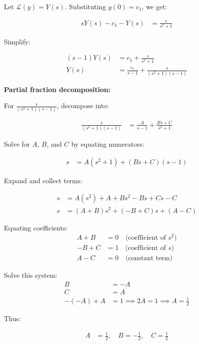 \documentclass[journal]{IEEEtran}
\begin{document}
	Let $\mathcal{L}(y) = Y(s)$. Substituting $y(0) = c_1$, we get:
	
	\begin{align}
		sY(s) - c_1 - Y(s) &= \frac{s}{s^2 + 1}
	\end{align}
	
	Simplify:
	
	\begin{align}
		(s - 1)Y(s) &= c_1 + \frac{s}{s^2 + 1} \\
		Y(s) &= \frac{c_1}{s - 1} + \frac{s}{(s^2 + 1)(s - 1)}
	\end{align}
	
	\textbf{Partial fraction decomposition:}
	
	For $\frac{s}{(s^2 + 1)(s - 1)}$, decompose into:
	
	\begin{align}
		\frac{s}{(s^2 + 1)(s - 1)} &= \frac{A}{s - 1} + \frac{Bs + C}{s^2 + 1}
	\end{align}
	
	Solve for $A$, $B$, and $C$ by equating numerators:
	
	\begin{align}
		s &= A(s^2 + 1) + (Bs + C)(s - 1)
	\end{align}
	
	Expand and collect terms:
	
	\begin{align}
		s &= A(s^2) + A + Bs^2 - Bs + Cs - C \\
		s &= (A + B)s^2 + (-B + C)s + (A - C)
	\end{align}
	
	Equating coefficients:
	\begin{align}
		A + B &= 0 \quad \text{(coefficient of $s^2$)} \\
		-B + C &= 1 \quad \text{(coefficient of $s$)} \\
		A - C &= 0 \quad \text{(constant term)}
	\end{align}
	
	Solve this system:
	\begin{align}
		B &= -A \\
		C &= A \\
		-(-A) + A &= 1 \implies 2A = 1 \implies A = \frac{1}{2}
	\end{align}
	
	Thus:
	
	\begin{align}
		A &= \frac{1}{2}, \quad B = -\frac{1}{2}, \quad C = \frac{1}{2}
	\end{align}
	
\end{document}
